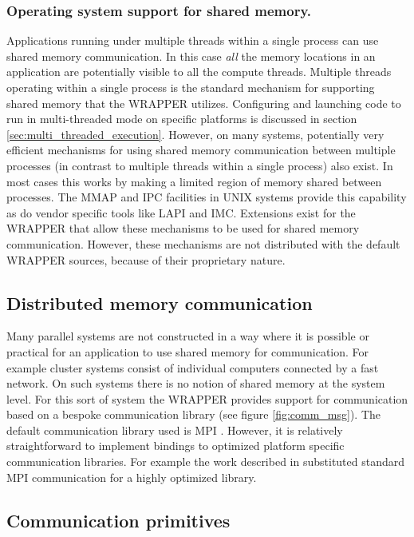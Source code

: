 \subsubsection{Operating system support for shared memory.}

Applications running under multiple threads within a single process
can use shared memory communication.  In this case {\it all} the
memory locations in an application are potentially visible to all the
compute threads. Multiple threads operating within a single process is
the standard mechanism for supporting shared memory that the WRAPPER
utilizes. Configuring and launching code to run in multi-threaded mode
on specific platforms is discussed in section
\ref{sec:multi_threaded_execution}.  However, on many systems,
potentially very efficient mechanisms for using shared memory
communication between multiple processes (in contrast to multiple
threads within a single process) also exist. In most cases this works
by making a limited region of memory shared between processes. The
MMAP %
and IPC %
facilities in UNIX
systems provide this capability as do vendor specific tools like LAPI
and IMC. %
Extensions exist for the
WRAPPER that allow these mechanisms to be used for shared memory
communication. However, these mechanisms are not distributed with the
default WRAPPER sources, because of their proprietary nature.

\subsection{Distributed memory communication}
\label{sec:distributed_memory_communication}
Many parallel systems are not constructed in a way where it is
possible or practical for an application to use shared memory for
communication. For example cluster systems consist of individual
computers connected by a fast network. On such systems there is no
notion of shared memory at the system level. For this sort of system
the WRAPPER provides support for communication based on a bespoke
communication library (see figure \ref{fig:comm_msg}).  The default
communication library used is MPI \cite{MPI-std-20}. However, it is
relatively straightforward to implement bindings to optimized platform
specific communication libraries. For example the work described in
\cite{hoe-hill:99} substituted standard MPI communication for a highly
optimized library.

\subsection{Communication primitives}
\label{sec:communication_primitives}

